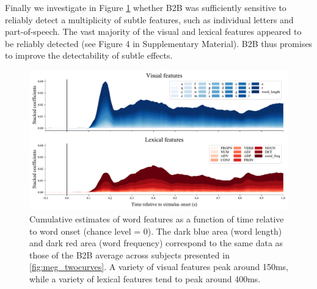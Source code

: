 Finally we investigate in Figure \ref{fig:megresult} whether B2B was sufficiently sensitive to reliably detect a multiplicity of subtle features, such as individual letters and part-of-speech. The vast majority of the visual and lexical features appeared to be reliably detected (see Figure 4 in Supplementary Material). B2B thus promises to improve the detectability of subtle effects.

\begin{figure}
  \centering
  \includegraphics[width=\textwidth, trim=0cm 0cm 0cm 0cm, clip=True]{figures/meg_result.pdf}
  \caption{Cumulative estimates of word features as a function of time relative to word onset (chance level = 0). The dark blue area (word length) and dark red area (word frequency) correspond to the same data as those of the B2B average across subjects presented in \ref{fig:meg_twocurves}. A variety of visual features peak around 150ms, while a variety of lexical features tend to peak around 400ms.}
  \label{fig:megresult}
\end{figure}
